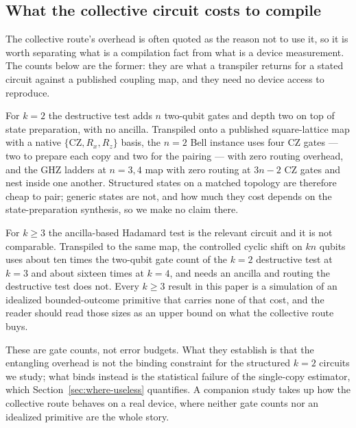 \hypertarget{what-the-collective-circuit-costs-to-compile}{%
\subsection{What the collective circuit costs to compile}\label{sec:compilation}}

The collective route's overhead is often quoted as the reason not to use it, so it is worth
separating what is a compilation fact from what is a device measurement. The counts below are the
former: they are what a transpiler returns for a stated circuit against a published coupling map,
and they need no device access to reproduce.

For \(k = 2\) the destructive test adds \(n\) two-qubit gates and depth two on top of state
preparation, with no ancilla. Transpiled onto a published square-lattice map with a native
\(\{\mathrm{CZ}, R_x, R_z\}\) basis, the \(n = 2\) Bell instance uses four CZ gates --- two to
prepare each copy and two for the pairing --- with zero routing overhead, and the GHZ ladders at
\(n = 3, 4\) map with zero routing at \(3n - 2\) CZ gates and nest inside one another. Structured
states on a matched topology are therefore cheap to pair; generic states are not, and how much
they cost depends on the state-preparation synthesis, so we make no claim there.

For \(k \ge 3\) the ancilla-based Hadamard test is the relevant circuit and it is not comparable.
Transpiled to the same map, the controlled cyclic shift on \(kn\) qubits uses about ten times the
two-qubit gate count of the \(k = 2\) destructive test at \(k = 3\) and about sixteen times at
\(k = 4\), and needs an ancilla and routing the destructive test does not. Every \(k \ge 3\) result
in this paper is a simulation of an idealized bounded-outcome primitive that carries none of that
cost, and the reader should read those sizes as an upper bound on what the collective route buys.

These are gate counts, not error budgets. What they establish is that the entangling overhead is
not the binding constraint for the structured \(k = 2\) circuits we study; what binds instead is
the statistical failure of the single-copy estimator, which Section~\ref{sec:where-useless}
quantifies. A companion study takes up how the collective route behaves on a real device, where
neither gate counts nor an idealized primitive are the whole story.
